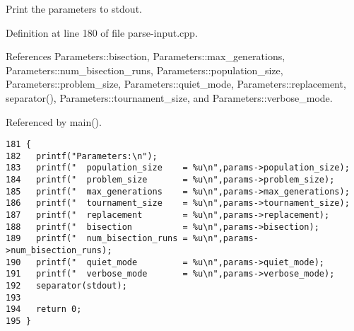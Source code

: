 Print the parameters to stdout. 



Definition at line 180 of file parse-input.cpp.

References Parameters::bisection, Parameters::max\_\-generations, Parameters::num\_\-bisection\_\-runs, Parameters::population\_\-size, Parameters::problem\_\-size, Parameters::quiet\_\-mode, Parameters::replacement, separator(), Parameters::tournament\_\-size, and Parameters::verbose\_\-mode.

Referenced by main().

\begin{Code}\begin{verbatim}181 {
182   printf("Parameters:\n");
183   printf("  population_size    = %u\n",params->population_size);
184   printf("  problem_size       = %u\n",params->problem_size);
185   printf("  max_generations    = %u\n",params->max_generations);
186   printf("  tournament_size    = %u\n",params->tournament_size);
187   printf("  replacement        = %u\n",params->replacement);
188   printf("  bisection          = %u\n",params->bisection);
189   printf("  num_bisection_runs = %u\n",params->num_bisection_runs);
190   printf("  quiet_mode         = %u\n",params->quiet_mode);
191   printf("  verbose_mode       = %u\n",params->verbose_mode);
192   separator(stdout);
193 
194   return 0;
195 }
\end{verbatim}\end{Code}


